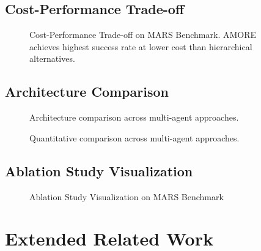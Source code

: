 \documentclass{article}
\theoremstyle{plain}
\theoremstyle{definition}
\theoremstyle{remark}
\begin{document}
\subsection{Cost-Performance Trade-off}
\begin{figure}[h]
	\centering
	\scalebox{0.7}{}
	\caption{Cost-Performance Trade-off on MARS Benchmark. AMORE achieves highest success rate at lower cost than hierarchical alternatives.}
	\label{fig:framework6}
\end{figure}

\subsection{Architecture Comparison}
\begin{figure}[h]
	\centering
	
	\caption{Architecture comparison across multi-agent approaches.}
	\label{fig:framework6_}
\end{figure}

\begin{figure}[h]
	\centering
	
	\caption{Quantitative comparison across multi-agent approaches.}
	\label{fig:framework6_1}
\end{figure}

\subsection{Ablation Study Visualization}
\begin{figure}[h]
	\centering
	\scalebox{0.55}{}
	\caption{Ablation Study Visualization on MARS Benchmark}
	\label{fig:framework7}
\end{figure}

\section{Extended Related Work}
\label{sec:extended_related}
\end{document}

